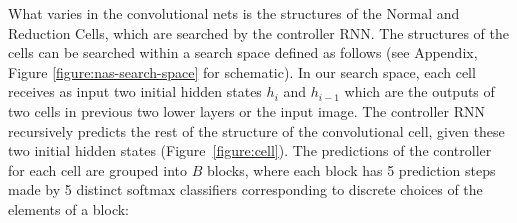 \documentclass[10pt,twocolumn,letterpaper]{article}
\begin{document}
What varies in the convolutional nets is the structures of the Normal and Reduction Cells, which are searched by the controller RNN. 
The structures of the cells can be searched within a search space defined as follows (see Appendix, Figure \ref{figure:nas-search-space} for schematic). In our search space, each cell receives as input two initial hidden states $h_i$ and $h_{i-1}$ which are the outputs of two cells in previous two lower layers or the input image. The controller RNN recursively predicts the rest of the structure of the convolutional cell, given these two initial hidden states (Figure~\ref{figure:cell}). The predictions of the controller for each cell are grouped into $B$ blocks, where each block has 5 prediction steps made by 5 distinct softmax classifiers corresponding to discrete choices of the elements of a block:
\end{document}
